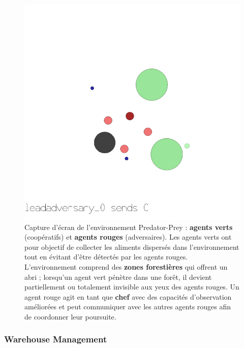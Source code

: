 %
\begin{figure}[h!]
  \centering
  \includegraphics[trim=0cm 4.5cm 0cm 1cm, clip,width=0.9\linewidth]{figures/predator_prey.png}
  \caption[Capture d'écran de l'environnement Predator-Prey]{Capture d'écran de l'environnement Predator-Prey : \textbf{agents verts} (coopératifs) et \textbf{agents rouges} (adversaires). Les agents verts ont pour objectif de collecter les aliments dispersés dans l'environnement tout en évitant d'être détectés par les agents rouges. L'environnement comprend des \textbf{zones forestières} qui offrent un abri ; lorsqu'un agent vert pénètre dans une forêt, il devient partiellement ou totalement invisible aux yeux des agents rouges. Un agent rouge agit en tant que \textbf{chef} avec des capacités d'observation améliorées et peut communiquer avec les autres agents rouges afin de coordonner leur poursuite.}
  \label{fig:predator_prey}
\end{figure}

\subsubsection*{Warehouse Management}

